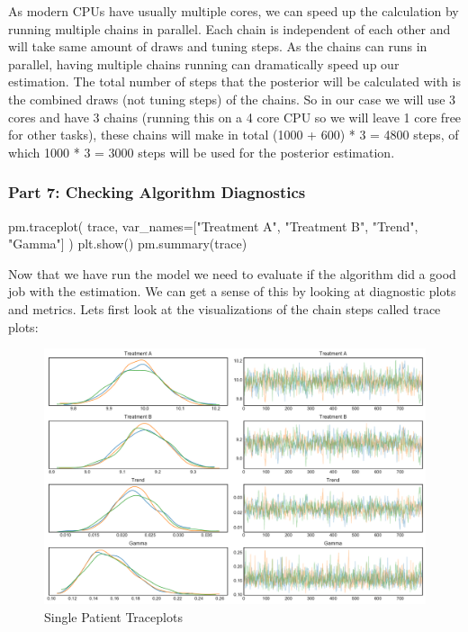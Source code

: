 \documentclass[12pt,a4paper,leqno]{report}
\theoremstyle{plain}
\theoremstyle{definition}
\theoremstyle{remark}
\begin{document}
As modern CPUs have usually multiple cores, we can speed up the calculation by running
multiple chains in parallel. Each chain is independent of each other and will
take same amount of draws and tuning steps. As the chains can runs in parallel, having
multiple chains running can dramatically speed up our estimation. The total number of steps that
the posterior will be calculated with is the combined draws (not tuning steps) of the
chains. So in our case we will use 3 cores and have 3 chains (running this on a 4 core
CPU so we will leave 1 core free for other tasks), these chains will make in total (1000 +
600) * 3 = 4800 steps, of which 1000 * 3 = 3000 steps will be used for the posterior estimation.

\subsubsection*{Part 7: Checking Algorithm Diagnostics}

\bigskip
\begin{pyverbatim}[][fontsize=\footnotesize]
    pm.traceplot(
            trace, var_names=["Treatment A", "Treatment B", "Trend", "Gamma"]
        )
    plt.show()
    pm.summary(trace)
\end{pyverbatim}
\smallskip

Now that we have run the model we need to evaluate if the algorithm did a good job with
the estimation. We can get a sense of this by looking at diagnostic plots and metrics.
Lets first look at the visualizations of the chain steps called trace plots:

\begin{figure}[H]
    \caption{Single Patient Traceplots}\label{traceplots}
    \includegraphics[width=\textwidth,height=\textheight,keepaspectratio]{single_patient_traceplot.pdf}
\end{figure}
\end{document}
